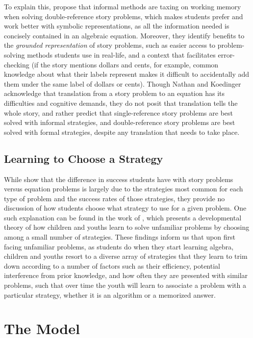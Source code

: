 \documentclass[10pt,letterpaper]{article}
\begin{document}
	To explain this,  propose that informal methods are taxing on working memory when solving double-reference story problems, which makes students prefer and work better with symbolic representations, as all the information needed is concisely contained in an algebraic equation. Moreover, they identify benefits to the \textit{grounded representation} of story problems, such as easier access to problem-solving methods students use in real-life, and a context that facilitates error-checking (if the story mentions dollars and cents, for example, common knowledge about what their labels represent makes it difficult to accidentally add them under the same label of dollars or cents). Though Nathan and Koedinger acknowledge that translation from a story problem to an equation has its difficulties and cognitive demands, they do not posit that translation tells the whole story, and rather predict that single-reference story problems are best solved with informal strategies, and double-reference story problems are best solved with formal strategies, despite any translation that needs to take place.
	
	\subsection{Learning to Choose a Strategy}
	
	While  show that the difference in success students have with story problems versus equation problems is largely due to the strategies most common for each type of problem and the success rates of those strategies, they provide no discussion of how students choose what strategy to use for a given problem. One such explanation can be found in the work of , which presents a developmental theory of how children and youths learn to solve unfamiliar problems by choosing among a small number of strategies. These findings inform us that upon first facing unfamiliar problems, as students do when they start learning algebra, children and youths resort to a diverse array of strategies that they learn to trim down according to a number of factors such as their efficiency, potential interference from prior knowledge, and how often they are presented with similar problems, such that over time the youth will learn to associate a problem with a particular strategy, whether it is an algorithm or a memorized answer.
	
	\section{The Model}
	
\end{document}

